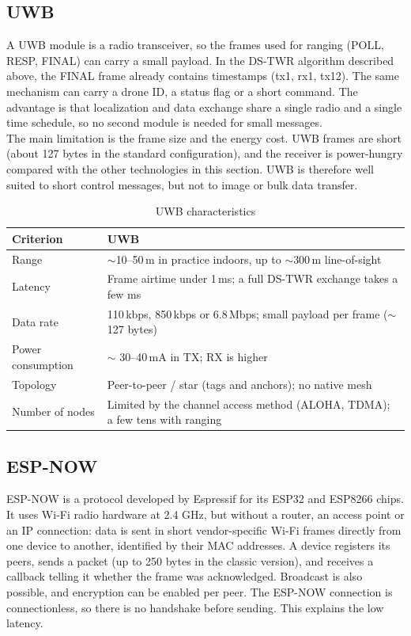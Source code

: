 \subsection{UWB}
A UWB module is a radio transceiver, so the frames used for ranging (POLL, RESP, FINAL) can carry a small payload. In the DS-TWR algorithm described above, the FINAL frame already contains timestamps (tx1, rx1, tx12). The same mechanism can carry a drone ID, a status flag or a short command. The advantage is that localization and data exchange share a single radio and a single time schedule, so no second module is needed for small messages.\\

\noindent The main limitation is the frame size and the energy cost. UWB frames are short (about 127 bytes in the standard configuration), and the receiver is power-hungry compared with the other technologies in this section. UWB is therefore well suited to short control messages, but not to image or bulk data transfer.

\begin{table}[H]
\centering
\label{tab:uwb}
\begin{tabular}{@{}p{3.7cm}p{10cm}@{}}
\toprule
\textbf{Criterion} & \textbf{UWB} \\
\midrule
Range & $\sim$10--50\,m in practice indoors, up to $\sim$300\,m line-of-sight \\
Latency & Frame airtime under 1\,ms; a full DS-TWR exchange takes a few ms \\
Data rate & 110\,kbps, 850\,kbps or 6.8\,Mbps; small payload per frame ($\sim$127 bytes) \\
Power consumption & $\sim$ 30--40\,mA in TX; RX is higher \\
Topology & Peer-to-peer / star (tags and anchors); no native mesh \\
Number of nodes & Limited by the channel access method (ALOHA, TDMA); a few tens with ranging \\
\bottomrule
\end{tabular}\caption{UWB characteristics }
\end{table}

\subsection{ESP-NOW}
ESP-NOW is a protocol developed by Espressif for its ESP32 and ESP8266 chips. It uses Wi-Fi radio hardware at 2.4 GHz, but without a router, an access point or an IP connection: data is sent in short vendor-specific Wi-Fi frames directly from one device to another, identified by their MAC addresses. A device registers its peers, sends a packet (up to 250 bytes in the classic version), and receives a callback telling it whether the frame was acknowledged. Broadcast is also possible, and encryption can be enabled per peer. The ESP-NOW connection is connectionless, so there is no handshake before sending. This explains the low latency.\\

